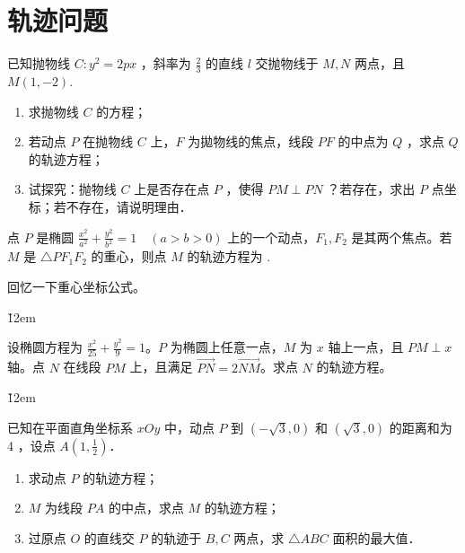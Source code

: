 \section{轨迹问题}

\begin{example}
    已知抛物线 $C: y^2=2 p x$ ，斜率为 $\frac{2}{3}$ 的直线 $l$ 交抛物线于 $M, N$ 两点，且 $M(1,-2)$.
    \begin{enumerate}
        \item 求抛物线 $C$ 的方程；
        \item 若动点 $P$ 在抛物线 $C$ 上，$F$ 为拋物线的焦点，线段 $P F$ 的中点为 $Q$ ，求点 $Q$ 的轨迹方程；
        \item 试探究：抛物线 $C$ 上是否存在点 $P$ ，使得 $P M \perp P N$ ？若存在，求出 $P$ 点坐标；若不存在，请说明理由．
    \end{enumerate}
\end{example}

\newpage{}

\begin{example}
    点 $P$ 是椭圆 $\frac{x^2}{a^2} + \frac{y^2}{b^2} = 1 \quad (a>b>0)$ 上的一个动点，$F_1, F_2$ 是其两个焦点。若 $M$ 是 $\triangle PF_1F_2$ 的重心，则点 $M$ 的轨迹方程为 \underline{\hspace{4cm}}.
\end{example}

\begin{tips}
    回忆一下重心坐标公式。
\end{tips}

\v{12em}

\begin{example}
    设椭圆方程为 $\frac{x^2}{25} + \frac{y^2}{9} = 1$。$P$ 为椭圆上任意一点，$M$ 为 $x$ 轴上一点，且 $PM \perp x$ 轴。点 $N$ 在线段 $PM$ 上，且满足 $\overrightarrow{PN} = 2\overrightarrow{NM}$。求点 $N$ 的轨迹方程。
\end{example}

\v{12em}

\begin{problem}
已知在平面直角坐标系 $x O y$ 中，动点 $P$ 到 $(-\sqrt{3}, 0)$ 和 $(\sqrt{3}, 0)$ 的距离和为 4 ，设点 $A\left(1, \frac{1}{2}\right)$．
\begin{enumerate}
    \item 求动点 $P$ 的轨迹方程；
    \item $M$ 为线段 $P A$ 的中点，求点 $M$ 的轨迹方程；
    \item 过原点 $O$ 的直线交 $P$ 的轨迹于 $B, C$ 两点，求 $\triangle A B C$ 面积的最大值．
\end{enumerate}
\end{problem}

